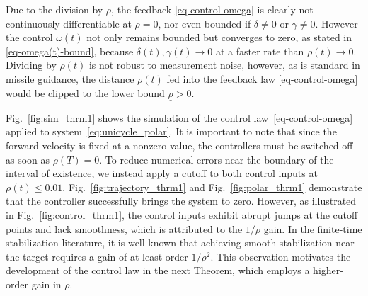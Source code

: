 \documentclass[letterpaper, 10 pt, conference]{ieeeconf}  %
\begin{document}
Due to the division by $\rho$, the feedback \eqref{eq-control-omega} is clearly not continuously differentiable at $\rho=0$, nor even bounded if $\delta\neq 0$ or $\gamma\neq 0$. However the control $\omega(t)$ not only remains bounded but converges to zero, as stated in \eqref{eq-omega(t)-bound}, because $\delta(t), \gamma(t)\rightarrow 0$ at a faster rate than $\rho(t)\rightarrow 0$. Dividing by $\rho(t)$ is not robust to measurement noise, however, as is standard in missile guidance, the distance $\rho(t)$ fed into the feedback law \eqref{eq-control-omega} would be clipped to the lower bound $\underline\rho>0$. 

Fig.~\ref{fig:sim_thrm1} shows the simulation of the control law~\eqref{eq-control-omega} applied to system~\eqref{eq:unicycle_polar}. It is important to note that since the forward velocity is fixed at a nonzero value, the controllers must be switched off as soon as $\rho(T) = 0$. To reduce numerical errors near the boundary of the interval of existence, we instead apply a cutoff to both control inputs at $\rho(t) \leq 0.01$. Fig.~\ref{fig:trajectory_thrm1} and Fig.~\ref{fig:polar_thrm1} demonstrate that the controller successfully brings the system to zero. However, as illustrated in Fig.~\ref{fig:control_thrm1}, the control inputs exhibit abrupt jumps at the cutoff points and lack smoothness, which is attributed to the $1/\rho$ gain. In the finite-time stabilization literature, it is well known that achieving smooth stabilization near the target requires a gain of at least order $1/\rho^2$. This observation motivates the development of the control law in the next Theorem, which employs a higher-order gain in $\rho$.
\end{document}
